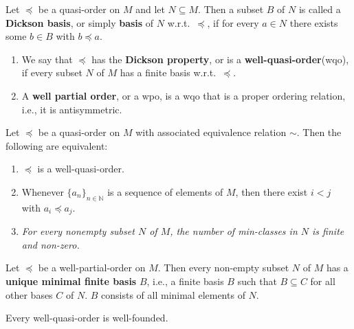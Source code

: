 \begin{definition}\label{def:wqo}
    Let $\preceq$ be a quasi-order on $M$ and let $N \subseteq M$. 
    Then a subset $B$ of $N$ is called a \textbf{Dickson basis}, or simply \textbf{basis} of $N$ w.r.t.\ $\preceq$, if for every $a \in N$ there exists some $b \in B$ with $b \preceq a$.
    \begin{enumerate}
        \item We say that $\preceq$ has the \textbf{Dickson property}, or is a \textbf{well-quasi-order}(wqo), if every subset $N$ of $M$ has a finite basis w.r.t.\ $\preceq$.
        \item A \textbf{well partial order}, or a wpo, is a wqo that is a proper ordering relation, i.e., it is antisymmetric.
    \end{enumerate}
\end{definition}
    
\begin{proposition}\label{prop:wqoEquivalent}
    Let $\preceq$ be a quasi-order on $M$ with associated equivalence relation $\sim$. 
    Then the following are equivalent:
    \begin{enumerate}
        \item $\preceq$ is a well-quasi-order.
        \item Whenever $\{a_n\}_{n \in \mathbb{N}}$ is a sequence of elements of $M$, then there exist $i < j$ with $a_i \preceq a_j$.
        \item \textit{For every nonempty subset $N$ of $M$, the number of min-classes in $N$ is finite and non-zero.}
    \end{enumerate}
\end{proposition}
    
\begin{corollary}\label{cor:MinimalFiniteBasis}
    Let $\preceq$ be a well-partial-order on $M$.
    Then every non-empty subset $N$ of $M$ has a \textup{\textbf{unique minimal finite basis}} $B$, i.e., a finite basis $B$ such that $B \subseteq C$ for all other bases $C$ of $N$. 
    $B$ consists of all minimal elements of $N$.
\end{corollary}
    
\begin{corollary}\label{cor:wqo_is_wellFounded}
    Every well-quasi-order is well-founded.
\end{corollary}
    
